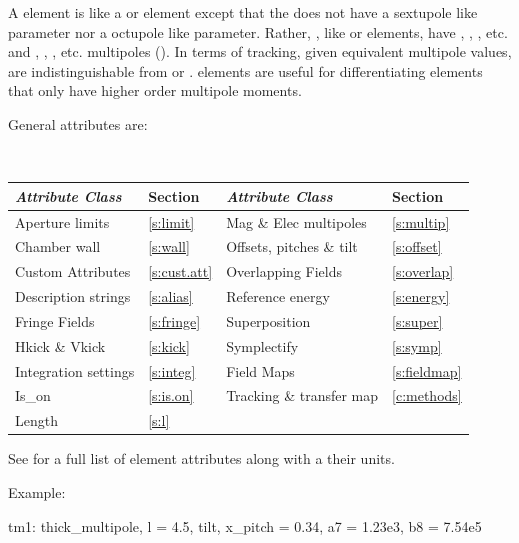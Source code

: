 {A  element is like a  or  element except that the
 does not have a  sextupole like parameter nor a  octupole like
parameter. Rather, , like  or  elements, have
, , , etc.  and , , , etc. multipoles
(). In terms of tracking, given equivalent multipole values, 
are indistinguishable from  or .   elements are
useful for differentiating elements that only have higher order multipole moments.

General  attributes are:
\begin{center}
\tt
\begin{tabular}{llll} \toprule
  {\sl Attribute Class}      & Section             & {\sl Attribute Class}      & Section            \\ \midrule
  Aperture limits            & \ref{s:limit}       & Mag \& Elec multipoles     & \ref{s:multip}     \\
  Chamber wall               & \ref{s:wall}        & Offsets, pitches \& tilt   & \ref{s:offset}     \\
  Custom Attributes          & \ref{s:cust.att}    & Overlapping Fields         & \ref{s:overlap}    \\
  Description strings        & \ref{s:alias}       & Reference energy           & \ref{s:energy}     \\ 
  Fringe Fields              & \ref{s:fringe}      & Superposition              & \ref{s:super}      \\
  Hkick \& Vkick             & \ref{s:kick}        & Symplectify                & \ref{s:symp}       \\
  Integration settings       & \ref{s:integ}       & Field Maps                 & \ref{s:fieldmap}   \\
  Is_on                      & \ref{s:is.on}       & Tracking \& transfer map   & \ref{c:methods}    \\ 
  Length                     & \ref{s:l}           &                            &                    \\
  \bottomrule
\end{tabular}
\end{center}
\toffset
See  for a full list of element attributes along with a their units.

Example:
\begin{example}
  tm1: thick_multipole, l = 4.5, tilt, x_pitch = 0.34, a7 = 1.23e3, b8 = 7.54e5
\end{example}

}
